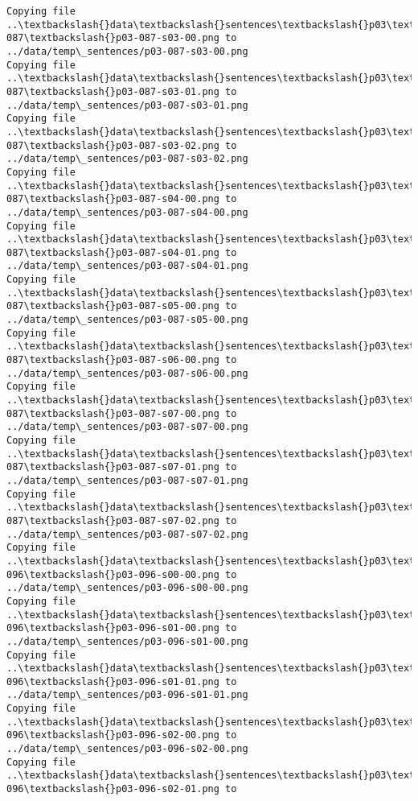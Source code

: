 \documentclass[11pt]{article}
\begin{document}
\begin{Verbatim}[commandchars=\\\{\}]
Copying file ..\textbackslash{}data\textbackslash{}sentences\textbackslash{}p03\textbackslash{}p03-087\textbackslash{}p03-087-s03-00.png to
../data/temp\_sentences/p03-087-s03-00.png
Copying file ..\textbackslash{}data\textbackslash{}sentences\textbackslash{}p03\textbackslash{}p03-087\textbackslash{}p03-087-s03-01.png to
../data/temp\_sentences/p03-087-s03-01.png
Copying file ..\textbackslash{}data\textbackslash{}sentences\textbackslash{}p03\textbackslash{}p03-087\textbackslash{}p03-087-s03-02.png to
../data/temp\_sentences/p03-087-s03-02.png
Copying file ..\textbackslash{}data\textbackslash{}sentences\textbackslash{}p03\textbackslash{}p03-087\textbackslash{}p03-087-s04-00.png to
../data/temp\_sentences/p03-087-s04-00.png
Copying file ..\textbackslash{}data\textbackslash{}sentences\textbackslash{}p03\textbackslash{}p03-087\textbackslash{}p03-087-s04-01.png to
../data/temp\_sentences/p03-087-s04-01.png
Copying file ..\textbackslash{}data\textbackslash{}sentences\textbackslash{}p03\textbackslash{}p03-087\textbackslash{}p03-087-s05-00.png to
../data/temp\_sentences/p03-087-s05-00.png
Copying file ..\textbackslash{}data\textbackslash{}sentences\textbackslash{}p03\textbackslash{}p03-087\textbackslash{}p03-087-s06-00.png to
../data/temp\_sentences/p03-087-s06-00.png
Copying file ..\textbackslash{}data\textbackslash{}sentences\textbackslash{}p03\textbackslash{}p03-087\textbackslash{}p03-087-s07-00.png to
../data/temp\_sentences/p03-087-s07-00.png
Copying file ..\textbackslash{}data\textbackslash{}sentences\textbackslash{}p03\textbackslash{}p03-087\textbackslash{}p03-087-s07-01.png to
../data/temp\_sentences/p03-087-s07-01.png
Copying file ..\textbackslash{}data\textbackslash{}sentences\textbackslash{}p03\textbackslash{}p03-087\textbackslash{}p03-087-s07-02.png to
../data/temp\_sentences/p03-087-s07-02.png
Copying file ..\textbackslash{}data\textbackslash{}sentences\textbackslash{}p03\textbackslash{}p03-096\textbackslash{}p03-096-s00-00.png to
../data/temp\_sentences/p03-096-s00-00.png
Copying file ..\textbackslash{}data\textbackslash{}sentences\textbackslash{}p03\textbackslash{}p03-096\textbackslash{}p03-096-s01-00.png to
../data/temp\_sentences/p03-096-s01-00.png
Copying file ..\textbackslash{}data\textbackslash{}sentences\textbackslash{}p03\textbackslash{}p03-096\textbackslash{}p03-096-s01-01.png to
../data/temp\_sentences/p03-096-s01-01.png
Copying file ..\textbackslash{}data\textbackslash{}sentences\textbackslash{}p03\textbackslash{}p03-096\textbackslash{}p03-096-s02-00.png to
../data/temp\_sentences/p03-096-s02-00.png
Copying file ..\textbackslash{}data\textbackslash{}sentences\textbackslash{}p03\textbackslash{}p03-096\textbackslash{}p03-096-s02-01.png to

\end{Verbatim}
\end{document}
